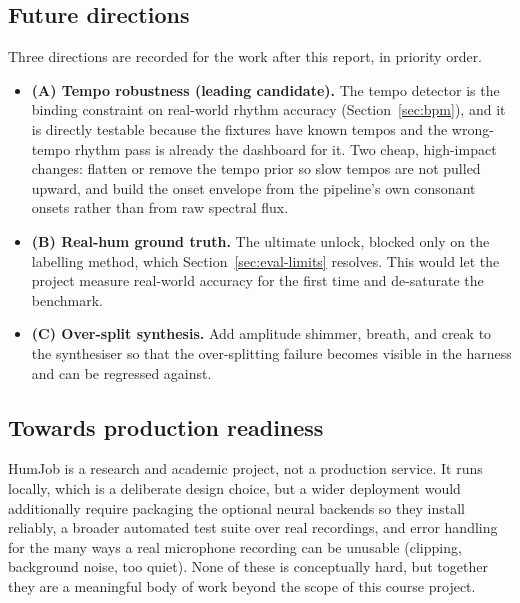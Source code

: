 \documentclass[12pt,a4paper]{article}
\begin{document}
\subsection{Future directions}
\label{sec:directions}

Three directions are recorded for the work after this report, in priority
order.

\begin{itemize}
    \item \textbf{(A) Tempo robustness (leading candidate).} The tempo detector
    is the binding constraint on real-world rhythm accuracy
    (Section~\ref{sec:bpm}), and it is directly testable because the fixtures
    have known tempos and the wrong-tempo rhythm pass is already the dashboard
    for it. Two cheap, high-impact changes: flatten or remove the tempo prior
    so slow tempos are not pulled upward, and build the onset envelope from the
    pipeline's own consonant onsets rather than from raw spectral flux.
    \item \textbf{(B) Real-hum ground truth.} The ultimate unlock, blocked only
    on the labelling method, which Section~\ref{sec:eval-limits} resolves. This
    would let the project measure real-world accuracy for the first time and
    de-saturate the benchmark.
    \item \textbf{(C) Over-split synthesis.} Add amplitude shimmer, breath, and
    creak to the synthesiser so that the over-splitting failure becomes
    visible in the harness and can be regressed against.
\end{itemize}

\subsection{Towards production readiness}

HumJob is a research and academic project, not a production service. It runs
locally, which is a deliberate design choice, but a wider deployment would
additionally require packaging the optional neural backends so they install
reliably, a broader automated test suite over real recordings, and error
handling for the many ways a real microphone recording can be unusable (clipping,
background noise, too quiet). None of these is conceptually hard, but together
they are a meaningful body of work beyond the scope of this course project.

\end{document}
